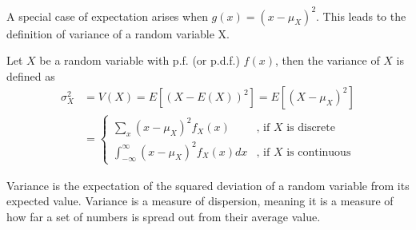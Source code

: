 \begin{note}
\end{note}

A special case of expectation arises when $g(x) = (x - \mu_X)^2$. This leads to the definition of variance of a random variable X.

\begin{definition}[Variance]
Let $X$ be a random variable with p.f. (or p.d.f.) $f(x)$, then the variance of $X$ is defined as 
\begin{equation*}
\begin{split}
\sigma_X^2 &= V(X) = E[(X - E(X))^2] =  E[(X - \mu_X)^2] \\
&= 
\begin{cases}
\sum_x (x - \mu_X)^2 f_X(x) & \text{, if $X$ is discrete} \\
\int_{-\infty}^{\infty}(x - \mu_X)^2 f_X(x)dx & \text{, if $X$ is continuous}
\end{cases}
\end{split}
\end{equation*}
\end{definition}

Variance is the expectation of the squared deviation of a random variable from its expected value. Variance is a measure of dispersion, meaning it is a measure of how far a set of numbers is spread out from their average value.

